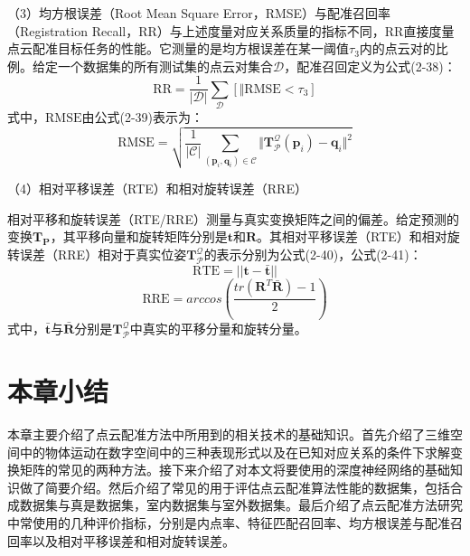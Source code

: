 （3）均方根误差（Root Mean Square Error，RMSE）与配准召回率（Registration Recall，RR）与上述度量对应关系质量的指标不同，RR直接度量点云配准目标任务的性能。它测量的是均方根误差在某一阈值$\tau_3$内的点云对的比例。给定一个数据集的所有测试集的点云对集合$\mathcal{D}$，配准召回定义为公式(2-38)：
\begin{equation}
    \mathrm{RR} = \frac{1}{ |\mathcal{D}|} \sum_{\mathcal{D}} [\Vert  \mathrm{RMSE} < \tau_3]
\end{equation}
式中，$\mathrm{RMSE}$由公式(2-39)表示为：
\begin{equation}
    \mathrm{RMSE} = \sqrt{\frac{1}{|\mathcal{C}|} \sum_{(\mathbf{p}_i,\mathbf{q}_i)\in  \mathcal{C}} \Vert \mathbf{T}_\mathcal{P}^\mathcal{Q}(\mathbf{p}_i)-\mathbf{q}_i \Vert^2}
\end{equation}

（4）相对平移误差（RTE）和相对旋转误差（RRE）\par
相对平移和旋转误差（RTE/RRE）测量与真实变换矩阵之间的偏差。给定预测的变换$\mathbf{T}_\mathbf{P}$，其平移向量和旋转矩阵分别是$\mathbf{t}$和$\mathbf{R}$。其相对平移误差（RTE）和相对旋转误差（RRE）相对于真实位姿$\mathbf{T}_\mathcal{P}^\mathcal{Q}$的表示分别为公式(2-40)，公式(2-41)：
\begin{equation}
        \mathrm{RTE} = || \mathbf{t} - \mathbf{\bar{t}} ||
\end{equation}
\begin{equation}
        \mathrm{RRE} = arccos(\frac{tr(\mathbf{R}^T \mathbf{\bar{R}})-1}{2})
\end{equation}
式中，$\mathbf{\bar{t}}$与$\mathbf{\bar{R}}$分别是$\mathbf{T}_\mathcal{P}^\mathcal{Q}$中真实的平移分量和旋转分量。

\section{本章小结}
本章主要介绍了点云配准方法中所用到的相关技术的基础知识。首先介绍了三维空间中的物体运动在数字空间中的三种表现形式以及在已知对应关系的条件下求解变换矩阵的常见的两种方法。接下来介绍了对本文将要使用的深度神经网络的基础知识做了简要介绍。然后介绍了常见的用于评估点云配准算法性能的数据集，包括合成数据集与真是数据集，室内数据集与室外数据集。最后介绍了点云配准方法研究中常使用的几种评价指标，分别是内点率、特征匹配召回率、均方根误差与配准召回率以及相对平移误差和相对旋转误差。
